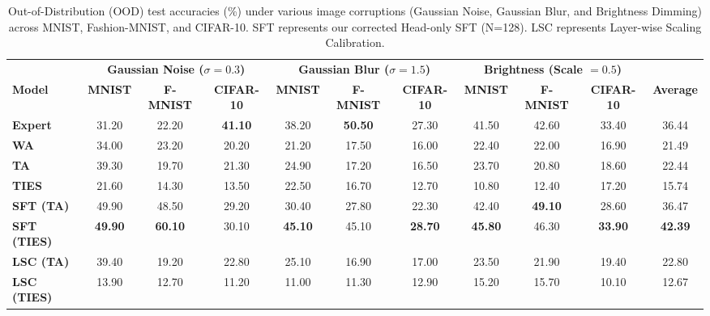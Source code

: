 \documentclass{article}
\theoremstyle{plain}
\theoremstyle{definition}
\theoremstyle{remark}
\begin{document}
\begin{table}[t]
  \caption{Out-of-Distribution (OOD) test accuracies (\%) under various image corruptions (Gaussian Noise, Gaussian Blur, and Brightness Dimming) across MNIST, Fashion-MNIST, and CIFAR-10. SFT represents our corrected Head-only SFT (N=128). LSC represents Layer-wise Scaling Calibration.}
  \label{tab:ood_accuracies}
  \centering
  \footnotesize
  \setlength{\tabcolsep}{3.0pt}
  \renewcommand{\arraystretch}{0.85}
  \begin{tabular}{lcccccccccc}
    \toprule
    & \multicolumn{3}{c}{\textbf{Gaussian Noise ($\sigma = 0.3$)}} & \multicolumn{3}{c}{\textbf{Gaussian Blur ($\sigma = 1.5$)}} & \multicolumn{3}{c}{\textbf{Brightness (Scale $= 0.5$)}} \\
    \cmidrule(lr){2-4} \cmidrule(lr){5-7} \cmidrule(lr){8-10}
    \textbf{Model} & \textbf{MNIST} & \textbf{F-MNIST} & \textbf{CIFAR-10} & \textbf{MNIST} & \textbf{F-MNIST} & \textbf{CIFAR-10} & \textbf{MNIST} & \textbf{F-MNIST} & \textbf{CIFAR-10} & \textbf{Average} \\
    \midrule
    \textbf{Expert}     & 31.20 & 22.20 & \textbf{41.10} & 38.20 & \textbf{50.50} & 27.30 & 41.50 & 42.60 & 33.40 & 36.44 \\
    \textbf{WA}         & 34.00 & 23.20 & 20.20 & 21.20 & 17.50 & 16.00 & 22.40 & 22.00 & 16.90 & 21.49 \\
    \textbf{TA}         & 39.30 & 19.70 & 21.30 & 24.90 & 17.20 & 16.50 & 23.70 & 20.80 & 18.60 & 22.44 \\
    \textbf{TIES}       & 21.60 & 14.30 & 13.50 & 22.50 & 16.70 & 12.70 & 10.80 & 12.40 & 17.20 & 15.74 \\
    \textbf{SFT (TA)}   & 49.90 & 48.50 & 29.20 & 30.40 & 27.80 & 22.30 & 42.40 & \textbf{49.10} & 28.60 & 36.47 \\
    \textbf{SFT (TIES)} & \textbf{49.90} & \textbf{60.10} & 30.10 & \textbf{45.10} & 45.10 & \textbf{28.70} & \textbf{45.80} & 46.30 & \textbf{33.90} & \textbf{42.39} \\
    \textbf{LSC (TA)}   & 39.40 & 19.20 & 22.80 & 25.10 & 16.90 & 17.00 & 23.50 & 21.90 & 19.40 & 22.80 \\
    \textbf{LSC (TIES)} & 13.90 & 12.70 & 11.20 & 11.00 & 11.30 & 12.90 & 15.20 & 15.70 & 10.10 & 12.67 \\
    \bottomrule
  \end{tabular}
\end{table}\vspace{-3.5mm}
\end{document}
